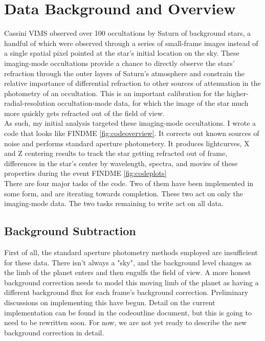 \documentclass[12pt]{article}
\begin{document}
\section{Data Background and Overview}

Cassini VIMS observed over 100 occultations by Saturn of background stars, a
handful of which were observed through a series of small-frame images instead
of a single spatial pixel pointed at the star's initial location on the sky.
These imaging-mode occultations provide a chance to directly observe the stars'
refraction through the outer layers of Saturn's atmosphere and constrain the
relative importance of differential refraction to other sources of attenuation
in the photometry of an occultation. This is an important calibration for the
higher-radial-resolution occultation-mode data, for which the image of the star
much more quickly gets refracted out of the field of view.\\

As such, my initial analysis targeted these imaging-mode occultations.  I wrote
a code that looks like FINDME \ref{fig:codeoverview}. It corrects out known
sources of noise and performs standard aperture photometery. It produces
lightcurves, X and Z centering results to track the star getting refracted out
of frame, differences in the star's center by wavelength, spectra, and movies
of these properties during the event FINDME \ref{fig:codeplots}\\

There are four major tasks of the code. Two of them have been implemented in
some form, and are iterating towards completion. These two act on only the
imaging-mode data. The two tasks remaining to write act on all data.

\subsection{Background Subtraction}

First of all, the standard aperture photometry methods employed are
insufficient for these data.  There isn't always a "sky", and the background
level changes as the limb of the planet enters and then engulfs the field of
view.  A more honest background correction needs to model this moving limb of
the planet as having a different background flux for each frame's background
correction. Preliminary discussions on implementing this have begun. Detail on
the current implementation can be found in the codeoutline document, but this
is going to need to be rewritten soon. For now, we are not yet ready to
describe the new background correction in detail.\\
\end{document}
